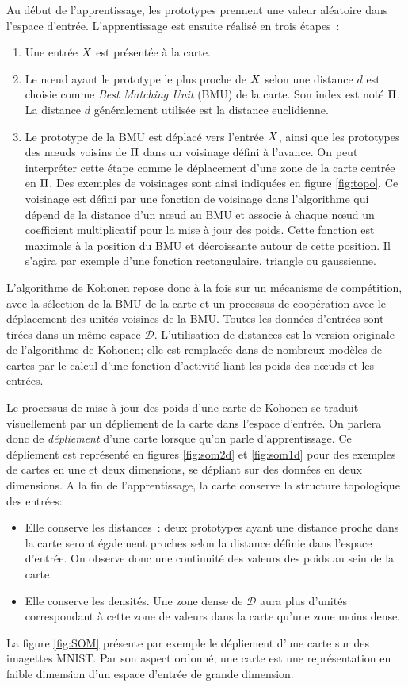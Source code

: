 \documentclass[../main]{subfiles}
\begin{document}
Au début de l'apprentissage, les prototypes prennent une valeur aléatoire dans l'espace d'entrée. 
L'apprentissage est ensuite réalisé en trois étapes~:
\begin{enumerate}
\item Une entrée $X$ est présentée à la carte.
\item Le n\oe{}ud ayant le prototype le plus proche de $X$ selon une distance $d$ est choisie comme \emph{Best Matching Unit} (BMU) de la carte. Son index est noté $\Pi$. La distance $d$ généralement utilisée est la distance euclidienne.
\item Le prototype de la BMU est déplacé vers l'entrée $X$, ainsi que les prototypes des n\oe{}uds voisins de $\Pi$ dans un voisinage défini à l'avance. On peut interpréter cette étape comme le déplacement d'une zone de la carte centrée en $\Pi$. Des exemples de voisinages sont ainsi indiquées en figure \ref{fig:topo}. Ce voisinage est défini par une fonction de voisinage dans l'algorithme qui dépend de la distance d'un n\oe{}ud au BMU et associe à chaque n\oe{}ud un coefficient multiplicatif pour la mise à jour des poids. Cette fonction est maximale à la position du BMU et décroissante autour de cette position. Il s'agira par exemple d'une fonction rectangulaire, triangle ou gaussienne.
\end{enumerate}

L'algorithme de Kohonen repose donc à la fois sur un mécanisme de compétition, avec la sélection de la BMU de la carte et un processus de coopération avec le déplacement des unités voisines de la BMU.
Toutes les données d'entrées sont tirées dans un même espace $\mathcal{D}$. L'utilisation de distances est la version originale de l'algorithme de Kohonen; elle est remplacée dans de nombreux modèles de cartes par le calcul d'une fonction d'activité liant les poids des n\oe{}uds et les entrées. 


Le processus de mise à jour des poids d'une carte de Kohonen se traduit visuellement par un dépliement de la carte dans l'espace d'entrée. On parlera donc de \emph{dépliement} d'une carte lorsque qu'on parle d'apprentissage. Ce dépliement est représenté en figures \ref{fig:som2d} et \ref{fig:som1d} pour des exemples de cartes en une et deux dimensions, se dépliant sur des données en deux dimensions. 
A la fin de l'apprentissage, la carte conserve la structure topologique des entrées:
\begin{itemize}
\item Elle conserve les distances~: deux prototypes ayant une distance proche dans la carte seront également proches selon la distance définie dans l'espace d'entrée. On observe donc une continuité des valeurs des poids au sein de la carte.
\item Elle conserve les densités. Une zone dense de $\mathcal{D}$ aura plus d'unités correspondant à cette zone de valeurs dans la carte qu'une zone moins dense.
\end{itemize}
La figure \ref{fig:SOM} présente par exemple le dépliement d'une carte sur des imagettes MNIST.
Par son aspect ordonné, une carte est une représentation en faible dimension d'un espace d'entrée de grande dimension.
\end{document}
